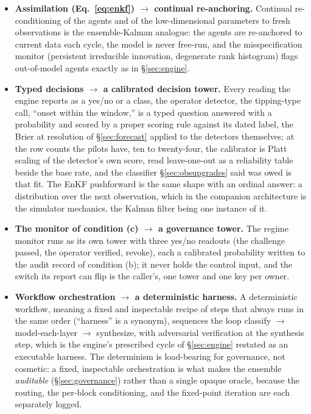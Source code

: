 \documentclass[11pt]{article}
\begin{document}
\begin{itemize}[itemsep=3pt,leftmargin=1.4em]
\item \textbf{Assimilation (Eq.~\eqref{eq:enkf}) $\rightarrow$ continual re-anchoring.} Continual re-conditioning of the agents and of the low-dimensional parameters to fresh observations is the ensemble-Kalman analogue: the agents are re-anchored to current data each cycle, the model is never free-run, and the misspecification monitor (persistent irreducible innovation, degenerate rank histogram) flags out-of-model agents exactly as in \S\ref{sec:engine}.
\item \textbf{Typed decisions $\rightarrow$ a calibrated decision tower.} Every reading the engine reports as a yes/no or a class, the operator detector, the tipping-type call, ``onset within the window,'' is a typed question answered with a probability and scored by a proper scoring rule against its dated label, the Brier at resolution of \S\ref{sec:forecast} applied to the detectors themselves; at the row counts the pilots have, ten to twenty-four, the calibrator is Platt scaling of the detector's own score, read leave-one-out as a reliability table beside the base rate, and the classifier \S\ref{sec:obsupgrades} said was owed is that fit. The EnKF pushforward is the same shape with an ordinal answer: a distribution over the next observation, which in the companion architecture is the simulator mechanics, the Kalman filter being one instance of it.
\item \textbf{The monitor of condition (c) $\rightarrow$ a governance tower.} The regime monitor runs as its own tower with three yes/no readouts (the challenge passed, the operator verified, revoke), each a calibrated probability written to the audit record of condition (b); it never holds the control input, and the switch its report can flip is the caller's, one tower and one key per owner.
\item \textbf{Workflow orchestration $\rightarrow$ a deterministic harness.} A deterministic workflow, meaning a fixed and inspectable recipe of steps that always runs in the same order (``harness'' is a synonym), sequences the loop classify $\rightarrow$ model-each-layer $\rightarrow$ synthesize, with adversarial verification at the synthesis step, which is the engine's prescribed cycle of \S\ref{sec:engine} restated as an executable harness. The determinism is load-bearing for governance, not cosmetic: a fixed, inspectable orchestration is what makes the ensemble \emph{auditable} (\S\ref{sec:governance}) rather than a single opaque oracle, because the routing, the per-block conditioning, and the fixed-point iteration are each separately logged.
\end{itemize}
\end{document}
